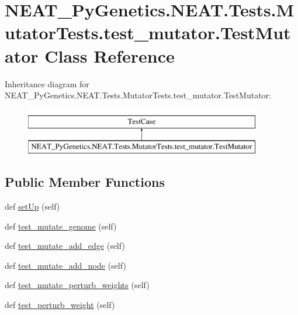 \hypertarget{classNEAT__PyGenetics_1_1NEAT_1_1Tests_1_1MutatorTests_1_1test__mutator_1_1TestMutator}{}\section{N\+E\+A\+T\+\_\+\+Py\+Genetics.\+N\+E\+A\+T.\+Tests.\+Mutator\+Tests.\+test\+\_\+mutator.\+Test\+Mutator Class Reference}
\label{classNEAT__PyGenetics_1_1NEAT_1_1Tests_1_1MutatorTests_1_1test__mutator_1_1TestMutator}
Inheritance diagram for N\+E\+A\+T\+\_\+\+Py\+Genetics.\+N\+E\+A\+T.\+Tests.\+Mutator\+Tests.\+test\+\_\+mutator.\+Test\+Mutator\+:\begin{figure}[H]
\begin{center}
\leavevmode
\includegraphics[height=2.000000cm]{classNEAT__PyGenetics_1_1NEAT_1_1Tests_1_1MutatorTests_1_1test__mutator_1_1TestMutator}
\end{center}
\end{figure}
\subsection*{Public Member Functions}
\begin{DoxyCompactItemize}
\item 
def \hyperlink{classNEAT__PyGenetics_1_1NEAT_1_1Tests_1_1MutatorTests_1_1test__mutator_1_1TestMutator_ab6963f4953e12ad7879c9c82a1144e96}{set\+Up} (self)
\item 
def \hyperlink{classNEAT__PyGenetics_1_1NEAT_1_1Tests_1_1MutatorTests_1_1test__mutator_1_1TestMutator_a4ead4b0d3f8592f35ecda9aab096e5f0}{test\+\_\+mutate\+\_\+genome} (self)
\item 
def \hyperlink{classNEAT__PyGenetics_1_1NEAT_1_1Tests_1_1MutatorTests_1_1test__mutator_1_1TestMutator_a2a424a939b89dada32dbd86547437105}{test\+\_\+mutate\+\_\+add\+\_\+edge} (self)
\item 
def \hyperlink{classNEAT__PyGenetics_1_1NEAT_1_1Tests_1_1MutatorTests_1_1test__mutator_1_1TestMutator_ae829878b5ef5591618f22d303806ea18}{test\+\_\+mutate\+\_\+add\+\_\+node} (self)
\item 
def \hyperlink{classNEAT__PyGenetics_1_1NEAT_1_1Tests_1_1MutatorTests_1_1test__mutator_1_1TestMutator_a1cd42e815cbb959e61b49bc1981abd36}{test\+\_\+mutate\+\_\+perturb\+\_\+weights} (self)
\item 
def \hyperlink{classNEAT__PyGenetics_1_1NEAT_1_1Tests_1_1MutatorTests_1_1test__mutator_1_1TestMutator_a19f9ebbfa5f5a3847d3895173f3f9bb0}{test\+\_\+perturb\+\_\+weight} (self)
\end{DoxyCompactItemize}
